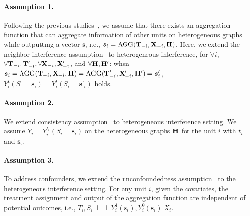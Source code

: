 \documentclass[runningheads]{llncs}
\begin{document}
\paragraph{Assumption 1.} %
Following the previous studies~\cite{ma2022learning,pmlr-v130-ma21c}, we assume that there exists an aggregation function that can aggregate information of other units on heterogeneous graphs while outputting a vector $\boldsymbol{s}$, i.e., $\boldsymbol{s}_i=\text{AGG}(\bold{T}_{-i},\bold{X}_{-i},\bold{H})$. Here, we extend the neighbor interference assumption~\cite{doi:10.1080/01621459.2020.1768100} to heterogeneous interference,
for $\forall i$, $\forall \bold{T}_{-i},\bold{T}'_{-i},\forall \bold{X}_{-i},\bold{X}'_{-i}$, and $\forall \bold{H},\bold{H}'$: 
when $\boldsymbol{s}_i={\rm{AGG}}(\bold{T}_{-i},\bold{X}_{-i},\bold{H}) = {\rm{AGG}}(\bold{T}'_{-i},\bold{X}'_{-i},\bold{H}') = \boldsymbol{s}'_i $,  $Y^t_i(S_i=\boldsymbol{s}_i) = Y^t_i(S_i=\boldsymbol{s}'_i)$ holds.
 
\paragraph{Assumption 2.}  We extend consistency assumption~\cite{doi:10.1080/01621459.2020.1768100} to heterogeneous interference setting. We assume $Y_i=Y_i^{t_i}(S_i=\boldsymbol{s}_i)$ on the heterogeneous graphs $\bold{H}$ for 
 the unit $i$ with $t_i$ and $\boldsymbol{s}_i$.

\paragraph{Assumption 3.} To address confounders, we extend the unconfoundedness assumption~\cite{doi:10.1080/01621459.2020.1768100,ma2022learning} to the heterogeneous interference setting. 
For any unit $i$, given the covariates, the treatment assignment and output of the aggregation function are independent of potential outcomes, i.e., $T_i,S_i \perp \!\!\! \perp Y_i^1(\boldsymbol{s}_i),Y_i^0(\boldsymbol{s}_i) \vert X_i$.


\end{document}

